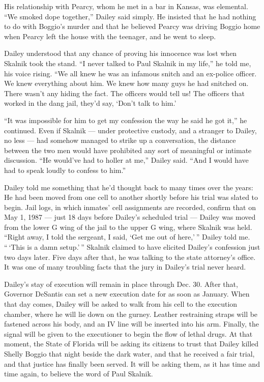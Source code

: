 His relationship with Pearcy, whom he met in a bar in Kansas, was
elemental. ``We smoked dope together,'' Dailey said simply. He insisted
that he had nothing to do with Boggio's murder and that he believed
Pearcy was driving Boggio home when Pearcy left the house with the
teenager, and he went to sleep.

Dailey understood that any chance of proving his innocence was lost when
Skalnik took the stand. ``I never talked to Paul Skalnik in my life,''
he told me, his voice rising. ``We all knew he was an infamous snitch
and an ex-police officer. We knew everything about him. We knew how many
guys he had snitched on. There wasn't any hiding the fact. The officers
would tell us! The officers that worked in the dang jail, they'd say,
`Don't talk to him.'

``It was impossible for him to get my confession the way he said he got
it,'' he continued. Even if Skalnik --- under protective custody, and a
stranger to Dailey, no less --- had somehow managed to strike up a
conversation, the distance between the two men would have prohibited any
sort of meaningful or intimate discussion. ``He would've had to holler
at me,'' Dailey said. ``And I would have had to speak loudly to confess
to him.''

Dailey told me something that he'd thought back to many times over the
years: He had been moved from one cell to another shortly before his
trial was slated to begin. Jail logs, in which inmates' cell assignments
are recorded, confirm that on May 1, 1987 --- just 18 days before
Dailey's scheduled trial --- Dailey was moved from the lower G wing of
the jail to the upper G wing, where Skalnik was held. ``Right away, I
told the sergeant, I said, `Get me out of here,' '' Dailey told me.
`` `This is a damn setup.' '' Skalnik claimed to have elicited Dailey's
confession just two days later. Five days after that, he was talking to
the state attorney's office. It was one of many troubling facts that the
jury in Dailey's trial never heard.

Dailey's stay of execution will remain in place through Dec. 30. After
that, Governor DeSantis can set a new execution date for as soon as
January. When that day comes, Dailey will be asked to walk from his cell
to the execution chamber, where he will lie down on the gurney. Leather
restraining straps will be fastened across his body, and an IV line will
be inserted into his arm. Finally, the signal will be given to the
executioner to begin the flow of lethal drugs. At that moment, the State
of Florida will be asking its citizens to trust that Dailey killed
Shelly Boggio that night beside the dark water, and that he received a
fair trial, and that justice has finally been served. It will be asking
them, as it has time and time again, to believe the word of Paul
Skalnik.

